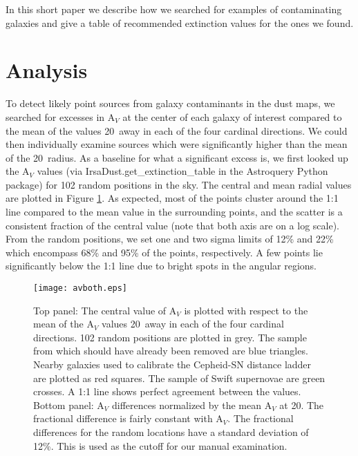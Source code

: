 \documentclass[twocolumn]{aastex63}
\begin{document}
In this short paper we describe how we searched for examples of contaminating galaxies and give a table of recommended extinction values for the ones we found.  


\section{Analysis} \label{sec_analysis}
  


To detect likely point sources from galaxy contaminants in the dust maps, we searched for excesses in A$_V$ at the center of each galaxy of interest compared to the mean of the values 20\arcmin\ away in each of the four cardinal directions.  We could then individually examine sources which were significantly higher than the mean of the 20\arcmin\ radius.  As a baseline for what a significant excess is, we first looked up the A$_V$ values (via IrsaDust.get\_extinction\_table in the Astroquery Python package) for 102 random positions in the sky.  The central and mean radial values are plotted in Figure \ref{fig_av}.  
As expected, most of the points cluster around the 1:1 line compared to the mean value in the surrounding points, and the scatter is a consistent fraction of the central value (note that both axis are on a log scale).  From the random positions, we set one and two sigma limits of 12\% and 22\% which encompass 68\% and 95\% of the points, respectively. 
A few points lie significantly below the 1:1 line due to bright spots in the angular regions.  


\begin{figure}
\texttt{[image: avboth.eps]}
\caption{Top panel: The central value of A$_V$ is plotted with respect to the mean of the A$_V$ values 20\arcmin\ away in each of the four cardinal directions.  102 random positions are plotted in grey.  The sample from \citet{Rice_etal_1988} which should have already been removed are blue triangles.  Nearby galaxies used to calibrate the Cepheid-SN distance ladder \citep{Riess_etal_2016} are plotted as red squares.  The sample of Swift supernovae are green crosses.  A 1:1 line shows perfect agreement between the values.
Bottom panel: A$_V$ differences normalized by the mean A$_V$ at 20\arcmin.  The fractional difference is fairly constant with A$_V$.  
The fractional differences for the random locations have a standard deviation of 12\%.  This is used as the cutoff for our manual examination.
\label{fig_av}}
\end{figure}
\end{document}

